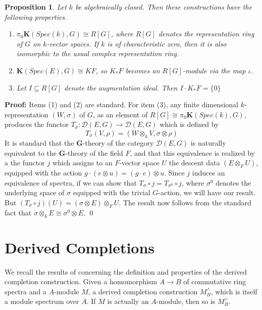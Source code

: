 \documentclass[11pt]{article}
\def \bK{\mathbf K}
\newcommand\mfk{\mathbf G}
\newtheorem{Proposition}{Proposition}[section]
\newenvironment{Proof}{\par\noindent\textbf{Proof:}}
{\qed}
\begin{document}
\begin{Proposition}\label{descentproperties}  Let $k$ be algebraically closed.  Then these constructions have the following properties. 
\begin{enumerate}[label=(\arabic*), font=\upshape]
    \item{ $\pi _0 \bK(Spec(k), G)   \cong R[G]$, where $R[G]$ denotes the  representation ring of $G$ on $k$-vector spaces. If $k$ is of characteristic zero, then it is also isomorphic to the usual complex representation ring.  }  
    \item{\label{fixedfield} $\bK(Spec(E), G) \cong KF$, so $K_*F$ becomes an $R[G]$-module via the   map $\iota$.  }
    \item{\label{zeroness} Let $I \subseteq R[G]$ denote the augmentation ideal.  Then $I \cdot K_*F = \{ 0 \} $}
\end{enumerate}
    
\end{Proposition}
\begin{Proof}
    Items (1) and (2)  are standard.  For item (3), any finite dimensional $k$-representation $(W,\sigma)  $  of $G$, as an element of $R[G] \cong \pi _0\bK(Spec(k), G)$, produces the  functor $T_{\sigma }: \mathcal{D}(E,G) \rightarrow \mathcal{D}(E,G) $ which is defined by 
    $$ T_{\sigma }(V,\rho) = (W \otimes _k V, \sigma \otimes \rho) 
    $$
 It is standard that the $\mfk$-theory of the category $\mathcal{D}(E,G)$ is naturally equivalent to the $\mfk$-theory of the field $F$, and that this equivalence is realized by a the functor $j$ which assigns to an $F$-vector space $U$ the descent data $(E \otimes _F U)$, equipped with the action $g \cdot (e \otimes u) = (g\cdot e) \otimes u$.  Since $j$ induces an equivalence of spectra, if we can show that $T_{\sigma} \circ j = T_{\sigma ^0} \circ j$, where $\sigma ^0$ denotes the underlying space of $\sigma$ equipped with the trivial $G$-action, we will have our result.  But $(T_{\sigma} \circ j)(U)  = (\sigma \otimes E) \otimes _F U$.  The result now follows from the standard fact that $\sigma \otimes _k E \cong \sigma ^0 \otimes E$. 
\end{Proof}
\section{Derived Completions} \label{derivedsection} 
  We recall the results of \cite{completion} concerning the definition and properties of the derived completion construction.  Given a homomorphism $ A \rightarrow B$ of commutative ring spectra and a $A$-module $M$,  a derived completion construction $M^{\wedge}_B$, which is itself a module spectrum over $A$.  If $M$ is actually an $A$-module, then so is $M^{\wedge} _B$. 
\end{document}
